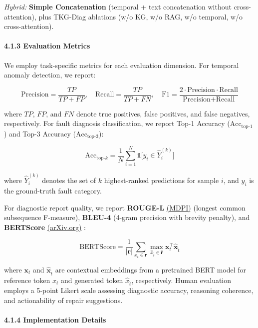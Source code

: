 \documentclass[
  11pt,
]{article}
\begin{document}
\emph{Hybrid:} \textbf{Simple Concatenation} (temporal + text
concatenation without cross-attention), plus TKG-Diag ablations (w/o KG,
w/o RAG, w/o temporal, w/o cross-attention).

\paragraph{4.1.3 Evaluation Metrics}\label{evaluation-metrics}

We employ task-specific metrics for each evaluation dimension. For
temporal anomaly detection, we report:

\[\text{Precision} = \frac{TP}{TP + FP}, \quad \text{Recall} = \frac{TP}{TP + FN}, \quad \text{F1} = \frac{2 \cdot \text{Precision} \cdot \text{Recall}}{\text{Precision} + \text{Recall}} \tag{10}\]

where \(TP\), \(FP\), and \(FN\) denote true positives, false positives,
and false negatives, respectively. For fault diagnosis classification,
we report Top-1 Accuracy (\(\text{Acc}_{\text{top-1}}\)) and Top-3
Accuracy (\(\text{Acc}_{\text{top-3}}\)):

\[\text{Acc}_{\text{top-}k} = \frac{1}{N} \sum_{i=1}^{N} \mathbb{1}\bigl[y_i \in \hat{Y}_i^{(k)}\bigr] \tag{11}\]

where \(\hat{Y}_i^{(k)}\) denotes the set of \(k\) highest-ranked
predictions for sample \(i\), and \(y_i\) is the ground-truth fault
category.

For diagnostic report quality, we report \textbf{ROUGE-L}
\href{https://www.mdpi.com/2079-9292/14/21/4180}{(MDPI)} (longest common
subsequence F-measure), \textbf{BLEU-4} (4-gram precision with brevity
penalty), and \textbf{BERTScore}
\href{https://arxiv.org/html/2412.17285}{(arXiv.org)} :

\[\text{BERTScore} = \frac{1}{|\mathbf{r}|} \sum_{x_t \in \mathbf{r}} \max_{\hat{x}_{\hat{t}} \in \hat{\mathbf{r}}} \mathbf{x}_t^{\top} \hat{\mathbf{x}}_{\hat{t}} \tag{12}\]

where \(\mathbf{x}_t\) and \(\hat{\mathbf{x}}_{\hat{t}}\) are contextual
embeddings from a pretrained BERT model for reference token \(x_t\) and
generated token \(\hat{x}_{\hat{t}}\), respectively. Human evaluation
employs a 5-point Likert scale assessing diagnostic accuracy, reasoning
coherence, and actionability of repair suggestions.

\paragraph{4.1.4 Implementation Details}\label{implementation-details-1}
\end{document}
